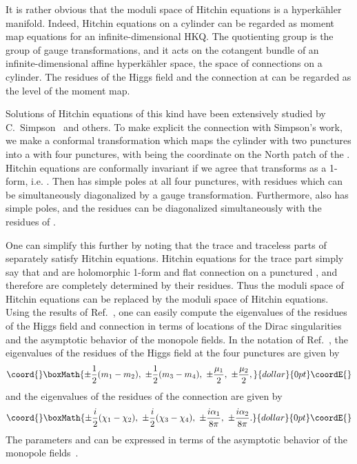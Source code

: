\documentclass[a4paper,12pt, amsfonts, amssymb]{article}
\providecommand{\PP}{{\mathbb P}}
\providecommand{\Tr}{{\rm Tr}}
\providecommand{\hphi}{{\hat\phi}}
\providecommand{\hA}{{\hat A}}
\begin{document}
It is rather obvious that the moduli space of Hitchin equations is a hyperk\"ahler manifold. Indeed, Hitchin equations on a
cylinder can be regarded as moment map equations for an infinite-dimensional
HKQ. The quotienting group is the group of gauge transformations, and
it acts on the cotangent bundle of an infinite-dimensional affine
hyperk\"ahler space, the space of \coordHE{} connections on a cylinder.
The residues of the Higgs field and the connection at \coordHE{} can
be regarded as the level of the moment map.

Solutions of Hitchin equations of this kind have been extensively studied by C.~Simpson~\cite{Simpson} and others. To make explicit the connection
with Simpson's work, we make a conformal transformation \coordHE{}
which maps the cylinder with two punctures into a \myHighlight{$\PP^1$}\coordHE{} with four
punctures, with \coordHE{} being the coordinate on the North patch of the \myHighlight{$\PP^1$}\coordHE{}.
Hitchin equations are conformally invariant if we agree that
\myHighlight{$\hphi$}\coordHE{} transforms as a 1-form, i.e. \myHighlight{$\hphi_s ds=\hphi_w dw$}\coordHE{}.
Then \myHighlight{$\hphi_w$}\coordHE{} has simple poles at all four punctures, with residues which
can be simultaneously diagonalized by a gauge transformation. Furthermore,
\myHighlight{$\hA_w$}\coordHE{} also has simple poles, and the residues can be diagonalized
simultaneously with the residues of \myHighlight{$\hphi_w$}\coordHE{}.

One can simplify this further
by noting that the trace and traceless parts of \myHighlight{$\hA_w,\hphi_w$}\coordHE{} separately
satisfy Hitchin equations. Hitchin equations for the trace part simply
say that \myHighlight{$\Tr\ \hphi_w$}\coordHE{} and \myHighlight{$\Tr\ \hA_w$}\coordHE{} are holomorphic 1-form and
flat connection on a punctured \myHighlight{$\PP^1$}\coordHE{}, and therefore are completely
determined by their residues. Thus the moduli space
of \coordHE{} Hitchin equations can be replaced by the moduli space of
\coordHE{} Hitchin equations. Using the results of Ref.~\cite{ustwo}, one can easily
compute the eigenvalues of the residues of the \coordHE{} Higgs field and connection in terms of locations of the Dirac singularities and the asymptotic behavior of the monopole fields. In the notation of Ref.~\cite{ustwo}, the eigenvalues of the residues of the Higgs field at the four punctures are given by
$$\coord{}\boxMath{
\pm\frac{1}{2}(m_1-m_2),\ \pm\frac{1}{2}(m_3-m_4),\ \pm\frac{\mu_1}{2},\
\pm\frac{\mu_2}{2},
}{dollar}{0pt}\coordE{}$$
and the eigenvalues of the residues of the connection are given by
$$\coord{}\boxMath{
\pm\frac{i}{2}(\chi_1-\chi_2),\ \pm\frac{i}{2}(\chi_3-\chi_4),\
\pm\frac{i\alpha_1}{8\pi},\ \pm\frac{i\alpha_2}{8\pi}.
}{dollar}{0pt}\coordE{}$$
The parameters \myHighlight{$\mu_1, \mu_2$}\coordHE{} and \coordHE{} can be expressed
in terms of the asymptotic behavior of the monopole fields~\cite{ustwo}.
\end{document}
